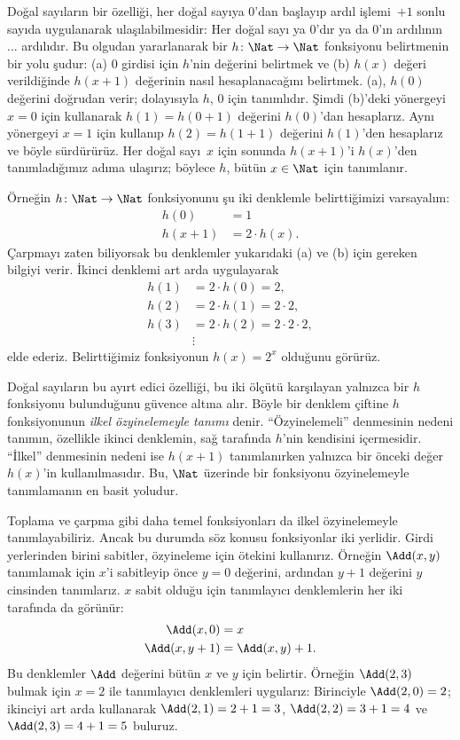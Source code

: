 \documentclass[../../../include/open-logic-section]{subfiles}
\begin{document}

Doğal sayıların bir özelliği, her doğal sayıya $0$'dan başlayıp ardıl
işlemi~$+1$ sonlu sayıda uygulanarak ulaşılabilmesidir: Her doğal sayı
ya $0$'dır ya da $0$'ın ardılının ... ardılıdır. Bu olgudan
yararlanarak bir $h\colon\Nat\to\Nat$ fonksiyonu belirtmenin bir yolu
şudur: (a) $0$ girdisi için $h$'nin değerini belirtmek ve (b) $h(x)$
değeri verildiğinde $h(x+1)$ değerinin nasıl hesaplanacağını belirtmek.
(a), $h(0)$ değerini doğrudan verir; dolayısıyla $h$, $0$ için
tanımlıdır. Şimdi (b)'deki yönergeyi $x=0$ için kullanarak
$h(1)=h(0+1)$ değerini $h(0)$'dan hesaplarız. Aynı yönergeyi $x=1$
için kullanıp $h(2)=h(1+1)$ değerini $h(1)$'den hesaplarız ve böyle
sürdürürüz. Her doğal sayı~$x$ için sonunda $h(x+1)$'i $h(x)$'den
tanımladığımız adıma ulaşırız; böylece $h$, bütün $x\in\Nat$ için
tanımlanır.

Örneğin $h\colon\Nat\to\Nat$ fonksiyonunu şu iki denklemle
belirttiğimizi varsayalım:
\begin{align*}
h(0) & =  1\\
h(x+1) & =  2 \cdot h(x).
\end{align*}
Çarpmayı zaten biliyorsak bu denklemler yukarıdaki (a) ve (b) için
gereken bilgiyi verir. İkinci denklemi art arda uygulayarak
\begin{align*}
  h(1) & = 2\cdot h(0) = 2,\\
  h(2) & = 2\cdot h(1) = 2\cdot 2,\\
  h(3) & = 2 \cdot h(2) = 2\cdot 2 \cdot 2,\\
  & \vdots
\end{align*}
elde ederiz. Belirttiğimiz fonksiyonun $h(x)=2^x$ olduğunu görürüz.

Doğal sayıların bu ayırt edici özelliği, bu iki ölçütü karşılayan
yalnızca bir $h$ fonksiyonu bulunduğunu güvence altına alır. Böyle bir
denklem çiftine $h$ fonksiyonunun \emph{ilkel özyinelemeyle tanımı}
denir. ``Özyinelemeli'' denmesinin nedeni tanımın, özellikle ikinci
denklemin, sağ tarafında $h$'nin kendisini içermesidir. ``İlkel''
denmesinin nedeni ise $h(x+1)$ tanımlanırken yalnızca bir önceki
değer~$h(x)$'in kullanılmasıdır. Bu, $\Nat$ üzerinde bir fonksiyonu
özyinelemeyle tanımlamanın en basit yoludur.

Toplama ve çarpma gibi daha temel fonksiyonları da ilkel özyinelemeyle
tanımlayabiliriz. Ancak bu durumda söz konusu fonksiyonlar iki
yerlidir. Girdi yerlerinden birini sabitler, özyineleme için ötekini
kullanırız. Örneğin $\Add(x,y)$ tanımlamak için $x$'i sabitleyip önce
$y=0$ değerini, ardından $y+1$ değerini $y$ cinsinden tanımlarız.
$x$ sabit olduğu için tanımlayıcı denklemlerin her iki tarafında da
görünür:
\begin{align*}
\Add(x,0) & = x\\
\Add(x,y+1) & = \Add(x,y)+1.
\end{align*}
Bu denklemler $\Add$ değerini bütün $x$ ve $y$ için belirtir. Örneğin
$\Add(2,3)$ bulmak için $x=2$ ile tanımlayıcı denklemleri uygularız:
Birinciyle $\Add(2,0)=2$; ikinciyi art arda kullanarak
$\Add(2,1)=2+1=3$, $\Add(2,2)=3+1=4$ ve $\Add(2,3)=4+1=5$ buluruz.
\end{document}
